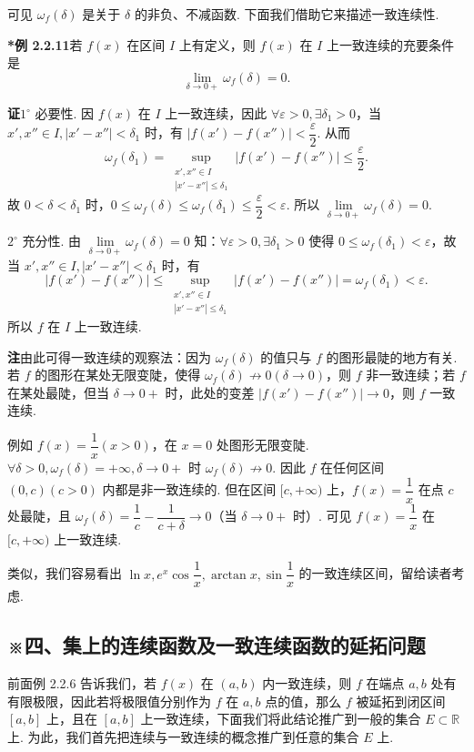 \documentclass[UTF8, 12pt, fontset=fandol, oneside]{ctexart}
\begin{document}
可见 $\omega_f(\delta)$ 是关于 $\delta$ 的非负、不减函数. 下面我们借助它来描述一致连续性.

\noindent\textbf{*例 2.2.11}\quad 若 $f(x)$ 在区间 $I$ 上有定义，则 $f(x)$ 在 $I$ 上一致连续的充要条件是
\[
  \lim_{\delta\to0+}\omega_f(\delta)=0.
\]

\noindent\textbf{证}\quad $1^\circ$ 必要性. 因 $f(x)$ 在 $I$ 上一致连续，因此 $\forall\varepsilon>0,\exists\delta_1>0$，当 $x',x''\in I,|x'-x''|<\delta_1$ 时，有 $|f(x')-f(x'')|<\dfrac\varepsilon2$. 从而
\[
  \omega_f(\delta_1)=\sup_{\substack{x',x''\in I\\ |x'-x''|\le\delta_1}}|f(x')-f(x'')|\le\frac\varepsilon2.
\]
故 $0<\delta<\delta_1$ 时，$0\le\omega_f(\delta)\le\omega_f(\delta_1)\le\dfrac\varepsilon2<\varepsilon$. 所以 $\lim\limits_{\delta\to0+}\omega_f(\delta)=0$.

$2^\circ$ 充分性. 由 $\lim\limits_{\delta\to0+}\omega_f(\delta)=0$ 知：$\forall\varepsilon>0,\exists\delta_1>0$ 使得 $0\le\omega_f(\delta_1)<\varepsilon$，故当 $x',x''\in I,|x'-x''|<\delta_1$ 时，有
\[
  |f(x')-f(x'')|\le
  \sup_{\substack{x',x''\in I\\ |x'-x''|\le\delta_1}}|f(x')-f(x'')|
  =\omega_f(\delta_1)<\varepsilon.
\]
所以 $f$ 在 $I$ 上一致连续.

\noindent\textbf{注}\quad 由此可得一致连续的观察法：因为 $\omega_f(\delta)$ 的值只与 $f$ 的图形最陡的地方有关. 若 $f$ 的图形在某处无限变陡，使得 $\omega_f(\delta)\not\to0(\delta\to0)$，则 $f$ 非一致连续；若 $f$ 在某处最陡，但当 $\delta\to0+$ 时，此处的变差 $|f(x')-f(x'')|\to0$，则 $f$ 一致连续.

例如 $f(x)=\dfrac1x(x>0)$，在 $x=0$ 处图形无限变陡. $\forall\delta>0,\omega_f(\delta)=+\infty,\delta\to0+$ 时 $\omega_f(\delta)\not\to0$. 因此 $f$ 在任何区间 $(0,c)(c>0)$ 内都是非一致连续的. 但在区间 $[c,+\infty)$ 上，$f(x)=\dfrac1x$ 在点 $c$ 处最陡，且 $\omega_f(\delta)=\dfrac1c-\dfrac1{c+\delta}\to0$（当 $\delta\to0+$ 时）. 可见 $f(x)=\dfrac1x$ 在 $[c,+\infty)$ 上一致连续.

类似，我们容易看出 $\ln x,e^x\cos\dfrac1x,\arctan x,\sin\dfrac1x$ 的一致连续区间，留给读者考虑.

\subsection*{※四、集上的连续函数及一致连续函数的延拓问题}

前面例 2.2.6 告诉我们，若 $f(x)$ 在 $(a,b)$ 内一致连续，则 $f$ 在端点 $a,b$ 处有有限极限，因此若将极限值分别作为 $f$ 在 $a,b$ 点的值，那么 $f$ 被延拓到闭区间 $[a,b]$ 上，且在 $[a,b]$ 上一致连续，下面我们将此结论推广到一般的集合 $E\subset\mathbb{R}$ 上. 为此，我们首先把连续与一致连续的概念推广到任意的集合 $E$ 上.
\end{document}
